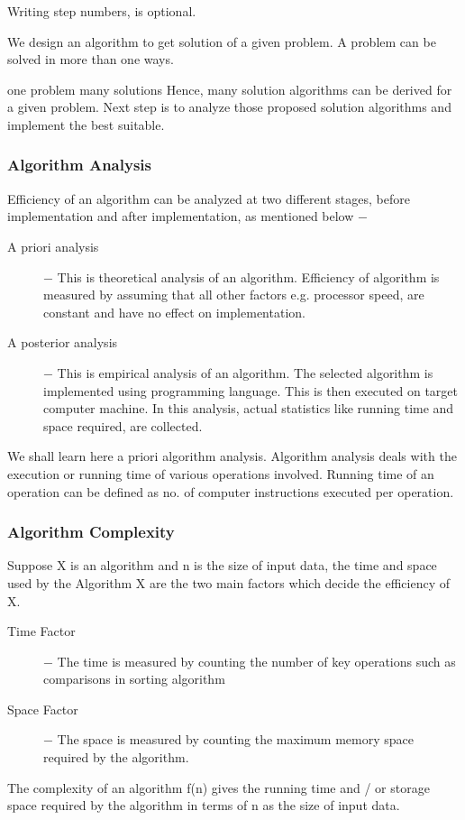 \documentclass{beamer}
\begin{document}
\begin{frame}
Writing step numbers, is optional.

We design an algorithm to get solution of a given problem. A problem can be solved in more than one ways.

one problem many solutions
Hence, many solution algorithms can be derived for a given problem. Next step is to analyze those proposed solution algorithms and implement the best suitable.
\end{frame}
\begin{frame}
\frametitle{Algorithm Analysis}
Efficiency of an algorithm can be analyzed at two different stages, before implementation and after implementation, as mentioned below −
\begin{description}
\item[A priori analysis] − This is theoretical analysis of an algorithm. Efficiency of algorithm is measured by assuming that all other factors e.g. processor speed, are constant and have no effect on implementation.

\item[A posterior analysis] − This is empirical analysis of an algorithm. The selected algorithm is implemented using programming language. This is then executed on target computer machine. In this analysis, actual statistics like running time and space required, are collected.
\end{description}
\end{frame}
\begin{frame}
We shall learn here a priori algorithm analysis. Algorithm analysis deals with the execution or running time of various operations involved. Running time of an operation can be defined as no. of computer instructions executed per operation.
\end{frame}
\begin{frame}
\frametitle{Algorithm Complexity}
Suppose X is an algorithm and n is the size of input data, the time and space used by the Algorithm X are the two main factors which decide the efficiency of X.
\begin{description}
\item[Time Factor] − The time is measured by counting the number of key operations such as comparisons in sorting algorithm

\item[Space Factor] − The space is measured by counting the maximum memory space required by the algorithm.
\end{description}
The complexity of an algorithm f(n) gives the running time and / or storage space required by the algorithm in terms of n as the size of input data.
\end{frame}
\end{document}
